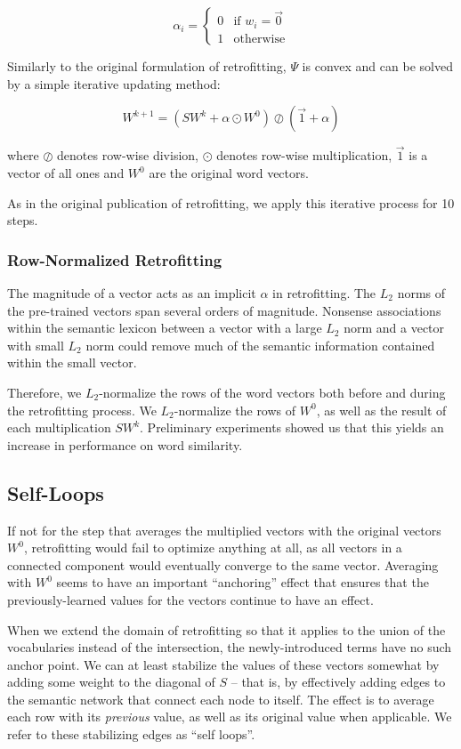 \documentclass[11pt]{article}
\begin{document}
$$
\alpha_i =
  \begin{cases}
    0 & \text{if $w_i = \vec{0}$} \\
    1 & \text{otherwise}
  \end{cases}
$$

Similarly to the original formulation of retrofitting, $\Psi$ is convex and can
be solved by a simple iterative updating method:

$$
W^{k+1} = \left( S W^k + \alpha \odot W^0 \right)
\oslash \left( \vec{1} + \alpha \right)
$$

where $\oslash$ denotes row-wise division, $\odot$ denotes row-wise
multiplication, $\vec{1}$ is a vector of all ones and $W^0$ are the original
word vectors.

As in the original publication of retrofitting, we apply this iterative process
for 10 steps.

\subsubsection{Row-Normalized Retrofitting}

The magnitude of a vector acts as an implicit $\alpha$ in retrofitting.
The $L_2$ norms of the pre-trained vectors span several orders of magnitude.
Nonsense associations within the semantic lexicon between a vector with a large
$L_2$ norm and a vector with small $L_2$ norm could remove much of the semantic
information contained within the small vector.

Therefore, we $L_2$-normalize
the rows of the word vectors both before and during the retrofitting process.
We $L_2$-normalize the rows of $W^0$, as well as the result of each
multiplication $S W^k$. Preliminary experiments showed us that this yields
an increase in performance on word similarity.

\subsection{Self-Loops}
If not for the step that averages the multiplied vectors with the original
vectors $W^0$, retrofitting would fail to optimize anything at all, as all
vectors in a connected component would eventually converge to the same vector.
Averaging with $W^0$ seems to have an important ``anchoring'' effect that
ensures that the previously-learned values for the vectors continue to have
an effect.

When we extend the domain of retrofitting so that it applies to the union of
the vocabularies instead of the intersection, the newly-introduced terms have
no such anchor point. We can at least stabilize the values of these vectors
somewhat by adding some weight to the diagonal of $S$ -- that is, by
effectively adding edges to the semantic network that connect each node to
itself. The effect is to average each row with its {\em previous} value, as
well as its original value when applicable. We refer to these stabilizing edges
as ``self loops''.
\end{document}
